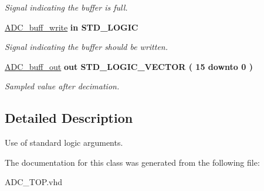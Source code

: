 \begin{DoxyCompactItemize}
\begin{DoxyCompactList}\small\item\em Signal indicating the buffer is full. \end{DoxyCompactList}\item 
\hypertarget{classADC__TOP_a854e269333aa7d7b4c2241ff9e71aaf2}{\hyperlink{classADC__TOP_a854e269333aa7d7b4c2241ff9e71aaf2}{A\-D\-C\-\_\-buff\-\_\-write}  {\bfseries {\bfseries \textcolor{vhdlkeyword}{in}\textcolor{vhdlchar}{ }}} {\bfseries \textcolor{comment}{S\-T\-D\-\_\-\-L\-O\-G\-I\-C}\textcolor{vhdlchar}{ }} }\label{classADC__TOP_a854e269333aa7d7b4c2241ff9e71aaf2}

\begin{DoxyCompactList}\small\item\em Signal indicating the buffer should be written. \end{DoxyCompactList}\item 
\hypertarget{classADC__TOP_a227e2ba1cceb52f292ef5768f933ba98}{\hyperlink{classADC__TOP_a227e2ba1cceb52f292ef5768f933ba98}{A\-D\-C\-\_\-buff\-\_\-out}  {\bfseries {\bfseries \textcolor{vhdlkeyword}{out}\textcolor{vhdlchar}{ }}} {\bfseries \textcolor{comment}{S\-T\-D\-\_\-\-L\-O\-G\-I\-C\-\_\-\-V\-E\-C\-T\-O\-R}\textcolor{vhdlchar}{ }\textcolor{vhdlchar}{(}\textcolor{vhdlchar}{ }\textcolor{vhdlchar}{ } \textcolor{vhdldigit}{15} \textcolor{vhdlchar}{ }\textcolor{vhdlchar}{ }\textcolor{vhdlchar}{ }\textcolor{vhdlkeyword}{downto}\textcolor{vhdlchar}{ }\textcolor{vhdlchar}{ }\textcolor{vhdlchar}{ } \textcolor{vhdldigit}{0} \textcolor{vhdlchar}{ }\textcolor{vhdlchar}{)}\textcolor{vhdlchar}{ }} }\label{classADC__TOP_a227e2ba1cceb52f292ef5768f933ba98}

\begin{DoxyCompactList}\small\item\em Sampled value after decimation. \end{DoxyCompactList}\end{DoxyCompactItemize}


\subsection{Detailed Description}
Use of standard logic arguments. 

The documentation for this class was generated from the following file\-:\begin{DoxyCompactItemize}
\item 
A\-D\-C\-\_\-\-T\-O\-P.\-vhd\end{DoxyCompactItemize}
